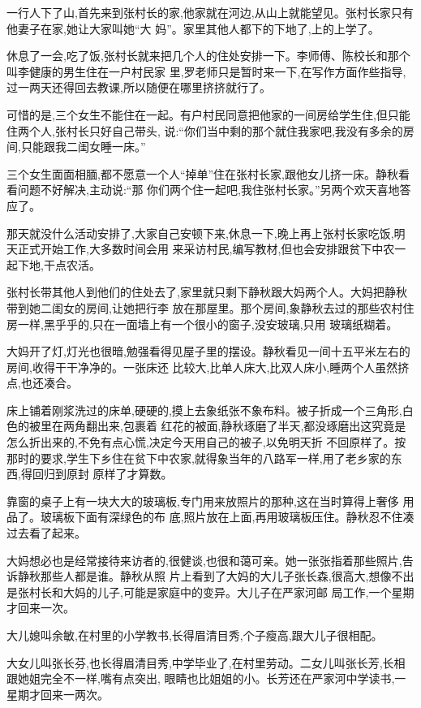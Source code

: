 ﻿\documentclass[12pt]{article}
\begin{document}
一行人下了山,首先来到张村长的家,他家就在河边,从山上就能望见。张村长家只有他妻子在家,她让大家叫她``大
妈''。家里其他人都下的下地了,上的上学了。

休息了一会,吃了饭,张村长就来把几个人的住处安排一下。李师傅、陈校长和那个叫李健康的男生住在一户村民家
里,罗老师只是暂时来一下,在写作方面作些指导,过一两天还得回去教课,所以随便在哪里挤挤就行了。

可惜的是,三个女生不能住在一起。有户村民同意把他家的一间房给学生住,但只能住两个人,张村长只好自己带头,
说:``你们当中剩的那个就住我家吧,我没有多余的房间,只能跟我二闺女睡一床。''

三个女生面面相腼,都不愿意一个人``掉单''住在张村长家,跟他女儿挤一床。静秋看看问题不好解决,主动说:``那
你们两个住一起吧,我住张村长家。''另两个欢天喜地答应了。

那天就没什么活动安排了,大家自己安顿下来,休息一下,晚上再上张村长家吃饭,明天正式开始工作,大多数时间会用
来采访村民,编写教材,但也会安排跟贫下中农一起下地,干点农活。

张村长带其他人到他们的住处去了,家里就只剩下静秋跟大妈两个人。大妈把静秋带到她二闺女的房间,让她把行李
放在那屋里。那个房间,象静秋去过的那些农村住房一样,黑乎乎的,只在一面墙上有一个很小的窗子,没安玻璃,只用
玻璃纸糊着。

大妈开了灯,灯光也很暗,勉强看得见屋子里的摆设。静秋看见一间十五平米左右的房间,收得干干净净的。一张床还
比较大,比单人床大,比双人床小,睡两个人虽然挤点,也还凑合。

床上铺着刚浆洗过的床单,硬硬的,摸上去象纸张不象布料。被子折成一个三角形,白色的被里在两角翻出来,包裹着
红花的被面,静秋琢磨了半天,都没琢磨出这究竟是怎么折出来的,不免有点心慌,决定今天用自己的被子,以免明天折
不回原样了。按那时的要求,学生下乡住在贫下中农家,就得象当年的八路军一样,用了老乡家的东西,得回归到原封
原样了才算数。

靠窗的桌子上有一块大大的玻璃板,专门用来放照片的那种,这在当时算得上奢侈 用品了。玻璃板下面有深绿色的布
底,照片放在上面,再用玻璃板压住。静秋忍不住凑过去看了起来。

大妈想必也是经常接待来访者的,很健谈,也很和蔼可亲。她一张张指着那些照片,告诉静秋那些人都是谁。静秋从照
片上看到了大妈的大儿子张长森,很高大,想像不出是张村长和大妈的儿子,可能是家庭中的变异。大儿子在严家河邮
局工作,一个星期才回来一次。

大儿媳叫余敏,在村里的小学教书,长得眉清目秀,个子瘦高,跟大儿子很相配。

大女儿叫张长芬,也长得眉清目秀,中学毕业了,在村里劳动。二女儿叫张长芳,长相跟她姐完全不一样,嘴有点突出,
眼睛也比姐姐的小。长芳还在严家河中学读书,一星期才回来一两次。
\end{document}
